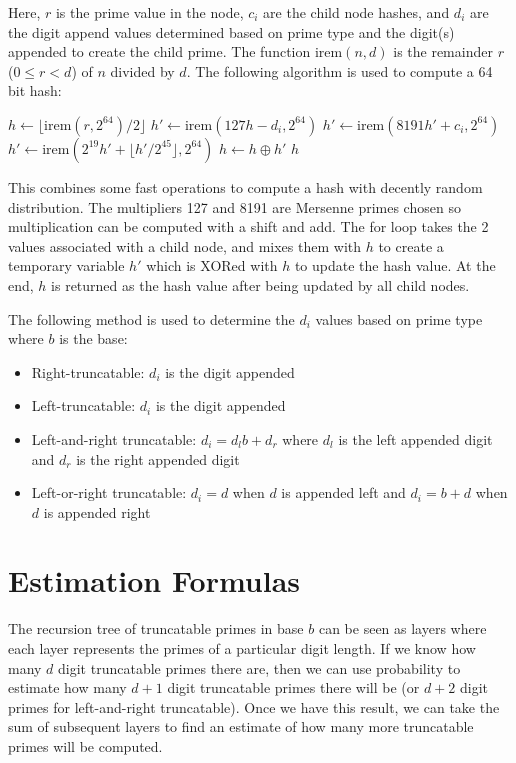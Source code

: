 \documentclass[12pt]{article}
\begin{document}
Here, $r$ is the prime value in the node, $c_i$ are the child node hashes, and $d_i$ are the digit append values determined based on prime type and the digit(s) appended to create the child prime. The function $\text{irem}(n,d)$ is the remainder $r$ ($0\leq r<d$) of $n$ divided by $d$. The following algorithm is used to compute a 64 bit hash:

\begin{algorithmic}[1]
\State $h \gets \lfloor \text{irem}(r,2^{64}) / 2 \rfloor$ 
\State $h' \gets \text{irem}(127h-d_i,2^{64})$
\State $h' \gets \text{irem}(8191h'+c_i,2^{64})$
\State $h' \gets \text{irem}(2^{19}h'+\lfloor h'/2^{45}\rfloor,2^{64})$ 
\State $h \gets h \oplus h'$ 
\EndFor
\State \Return $h$
\EndFunction
\end{algorithmic}

This combines some fast operations to compute a hash with decently random distribution. The multipliers 127 and 8191 are Mersenne primes chosen so multiplication can be computed with a shift and add. The for loop takes the 2 values associated with a child node, and mixes them with $h$ to create a temporary variable $h'$ which is XORed with $h$ to update the hash value. At the end, $h$ is returned as the hash value after being updated by all child nodes.

The following method is used to determine the $d_i$ values based on prime type where $b$ is the base:

\begin{itemize}
\item Right-truncatable: $d_i$ is the digit appended
\item Left-truncatable: $d_i$ is the digit appended
\item Left-and-right truncatable: $d_i=d_lb+d_r$ where $d_l$ is the left appended digit and $d_r$ is the right appended digit
\item Left-or-right truncatable: $d_i=d$ when $d$ is appended left and $d_i=b+d$ when $d$ is appended right
\end{itemize}

\section{Estimation Formulas}

The recursion tree of truncatable primes in base $b$ can be seen as layers where each layer represents the primes of a particular digit length. If we know how many $d$ digit truncatable primes there are, then we can use probability to estimate how many $d+1$ digit truncatable primes there will be (or $d+2$ digit primes for left-and-right truncatable). Once we have this result, we can take the sum of subsequent layers to find an estimate of how many more truncatable primes will be computed.
\end{document}

